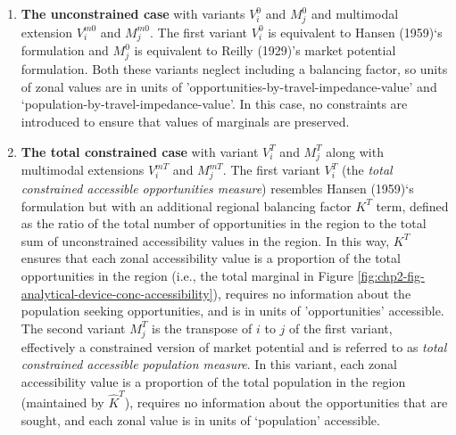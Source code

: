 \documentclass[
11pt, %
oneside, %
english, %
singlespacing, %
]{macthesis} %
\begin{document}
\begin{enumerate}
\def\labelenumi{\arabic{enumi}.}
\item
  \textbf{The unconstrained case} with variants \(V_i^0\) and \(M_j^0\) and multimodal extension \(V_i^{m0}\) and \(M_j^{m0}\). The first variant \(V_i^0\) is equivalent to Hansen (1959)`s formulation and \(M_j^0\) is equivalent to Reilly (1929)'s market potential formulation. Both these variants neglect including a balancing factor, so units of zonal values are in units of 'opportunities-by-travel-impedance-value' and `population-by-travel-impedance-value'. In this case, no constraints are introduced to ensure that values of marginals are preserved.
\item
  \textbf{The total constrained case} with variant \(V_i^T\) and \(M_j^T\) along with multimodal extensions \(V_i^{mT}\) and \(M_j^{mT}\). The first variant \(V_i^T\) (the \emph{total constrained accessible opportunities measure}) resembles Hansen (1959)`s formulation but with an additional regional balancing factor \(K^T\) term, defined as the ratio of the total number of opportunities in the region to the total sum of unconstrained accessibility values in the region. In this way, \(K^T\) ensures that each zonal accessibility value is a proportion of the total opportunities in the region (i.e., the total marginal in Figure \ref{fig:chp2-fig-analytical-device-conc-accessibility}), requires no information about the population seeking opportunities, and is in units of 'opportunities' accessible. The second variant \(M_j^T\) is the transpose of \(i\) to \(j\) of the first variant, effectively a constrained version of market potential and is referred to as \emph{total constrained accessible population measure}. In this variant, each zonal accessibility value is a proportion of the total population in the region (maintained by \(\hat K^T\)), requires no information about the opportunities that are sought, and each zonal value is in units of `population' accessible.
\end{enumerate}
\end{document}
